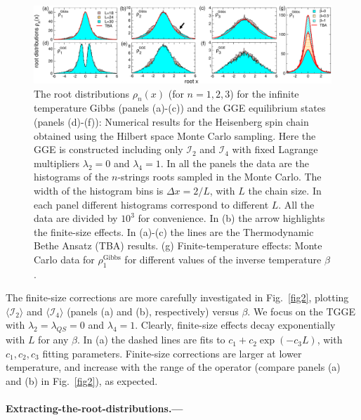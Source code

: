 \documentclass[twocolumn,superscriptaddress,prb,10pt]{revtex4-1}
\begin{document}
\begin{figure}[t]
\includegraphics*[width=0.99\linewidth]{./draft_figs/fig2}
\caption{The root distributions $\rho_n(x)$ (for $n=1,2,3$) for the infinite temperature 
 Gibbs (panels (a)-(c)) and the GGE equilibrium states (panels (d)-(f)): Numerical  
 results for the Heisenberg spin chain obtained using the Hilbert space Monte Carlo 
 sampling. Here the GGE is constructed including only ${\mathcal I}_2$ and ${\mathcal I}_4$ 
 with fixed Lagrange multipliers $\lambda_2=0$ and $\lambda_4=1$. In all the panels the 
 data are the histograms of the $n$-strings roots sampled in the Monte Carlo.
 The width of the histogram bins is $\Delta x=2/L$, with $L$ the chain size. 
 In each panel different histograms correspond to different $L$. All the data are divided 
 by $10^3$ for convenience. In (b) the arrow highlights the finite-size effects. In 
 (a)-(c) the lines are the Thermodynamic Bethe Ansatz (TBA) results. (g) Finite-temperature 
 effects: Monte Carlo data for $\rho^{\textrm{Gibbs}}_1$ for different values of the 
 inverse temperature $\beta$.
}
\label{fig3}
\end{figure}


The finite-size corrections are more carefully investigated in Fig.~\ref{fig2},   
plotting $\langle{\mathcal I}_2\rangle$ and $\langle {\mathcal I}_4
\rangle$ (panels (a) and (b), respectively) versus $\beta$. We focus on 
the TGGE with $\lambda_2=\lambda_{QS}=0$ and $\lambda_4=1$. Clearly,  
finite-size effects decay exponentially~\cite{iyer-2015} with $L$ for any $\beta$. In (a) the dashed 
lines are fits to $c_1+c_2\exp(-c_3L)$, with $c_1,c_2,c_3$ fitting parameters. 
Finite-size  corrections are larger at lower temperature, and increase with the 
range of the operator (compare panels  (a) and (b) in Fig.~\ref{fig2}), as expected. 

\paragraph*{Extracting-the-root-distributions.---}
\end{document}
